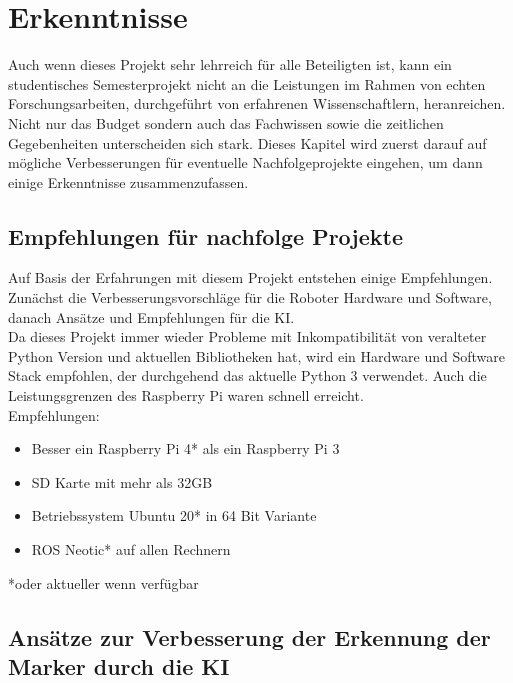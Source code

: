 \documentclass[conference]{IEEEtran}
\begin{document}
	\section{Erkenntnisse }
	Auch wenn dieses Projekt sehr lehrreich für alle Beteiligten ist, kann ein studentisches Semesterprojekt nicht an die Leistungen im Rahmen von echten Forschungsarbeiten, durchgeführt von erfahrenen Wissenschaftlern, heranreichen. Nicht nur das Budget sondern auch das Fachwissen sowie die zeitlichen Gegebenheiten unterscheiden sich stark. Dieses Kapitel wird zuerst darauf auf mögliche Verbesserungen für eventuelle Nachfolgeprojekte eingehen, um dann einige Erkenntnisse zusammenzufassen. 
	
	\subsection{Empfehlungen für nachfolge Projekte}
	
	 Auf Basis der Erfahrungen mit diesem Projekt entstehen einige 
	 Empfehlungen. Zunächst die Verbesserungsvorschläge für die Roboter 
	 Hardware und Software, danach Ansätze und Empfehlungen für die KI.\\
	Da dieses Projekt immer wieder Probleme mit Inkompatibilität von veralteter Python Version und aktuellen Bibliotheken hat, wird ein Hardware und Software Stack empfohlen, der durchgehend das aktuelle Python 3 verwendet. Auch die Leistungsgrenzen des Raspberry Pi waren schnell erreicht. \\
	
	Empfehlungen:
	\begin{itemize}
		\item  Besser ein Raspberry Pi 4* als ein Raspberry Pi 3
		\item  SD Karte mit mehr als 32GB
		\item Betriebssystem Ubuntu 20* in 64 Bit Variante
		\item  ROS Neotic* auf allen Rechnern
	\end{itemize}
	*oder aktueller wenn verfügbar
	\subsection{Ansätze zur Verbesserung der Erkennung der Marker durch die KI}
	
\end{document}
